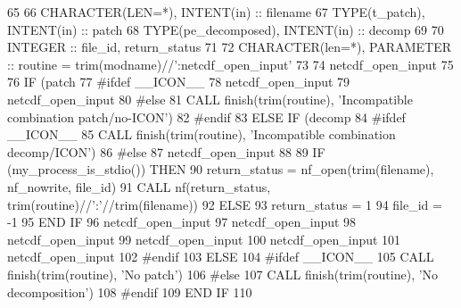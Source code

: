 \begin{DoxyCode}
65 
66     \textcolor{keywordtype}{CHARACTER(LEN=*)},    \textcolor{keywordtype}{INTENT(in)} :: filename
67     \textcolor{keywordtype}{TYPE}(t\_patch),       \textcolor{keywordtype}{INTENT(in)} :: patch
68     \textcolor{keywordtype}{TYPE}(pe\_decomposed), \textcolor{keywordtype}{INTENT(in)} :: decomp
69 
70     \textcolor{keywordtype}{INTEGER} :: file\_id, return\_status
71 
72     \textcolor{keywordtype}{CHARACTER(len=*)}, \textcolor{keywordtype}{PARAMETER} :: routine = trim(modname)//\textcolor{stringliteral}{':netcdf\_open\_input'}
73 
74     netcdf\_open\_input%
75 
76     \textcolor{keywordflow}{IF} (patch%
77 \textcolor{preprocessor}{#ifdef \_\_ICON\_\_}
78 \textcolor{preprocessor}{}      netcdf\_open\_input%
79       netcdf\_open\_input%
80 \textcolor{preprocessor}{#else}
81 \textcolor{preprocessor}{}      \textcolor{keyword}{CALL }finish(trim(routine), \textcolor{stringliteral}{'Incompatible combination patch/no-ICON'})
82 \textcolor{preprocessor}{#endif}
83 \textcolor{preprocessor}{}    \textcolor{keywordflow}{ELSE} \textcolor{keywordflow}{IF} (decomp%
84 \textcolor{preprocessor}{#ifdef \_\_ICON\_\_}
85 \textcolor{preprocessor}{}      \textcolor{keyword}{CALL }finish(trim(routine), \textcolor{stringliteral}{'Incompatible combination decomp/ICON'})
86 \textcolor{preprocessor}{#else}
87 \textcolor{preprocessor}{}      netcdf\_open\_input%
88 
89       \textcolor{keywordflow}{IF} (my\_process\_is\_stdio()) \textcolor{keywordflow}{THEN}
90         return\_status = nf\_open(trim(filename), nf\_nowrite, file\_id)
91         \textcolor{keyword}{CALL }nf(return\_status, trim(routine)//\textcolor{stringliteral}{':'}//trim(filename))
92       \textcolor{keywordflow}{ELSE}
93         return\_status = 1
94         file\_id = -1
95 \textcolor{keywordflow}{      END IF}
96       netcdf\_open\_input%
97       netcdf\_open\_input%
98       netcdf\_open\_input%
99       netcdf\_open\_input%
100       netcdf\_open\_input%
101       netcdf\_open\_input%
102 \textcolor{preprocessor}{#endif}
103 \textcolor{preprocessor}{}    \textcolor{keywordflow}{ELSE}
104 \textcolor{preprocessor}{#ifdef \_\_ICON\_\_}
105 \textcolor{preprocessor}{}      \textcolor{keyword}{CALL }finish(trim(routine), \textcolor{stringliteral}{'No patch'})
106 \textcolor{preprocessor}{#else}
107 \textcolor{preprocessor}{}      \textcolor{keyword}{CALL }finish(trim(routine), \textcolor{stringliteral}{'No decomposition'})
108 \textcolor{preprocessor}{#endif}
109 \textcolor{preprocessor}{}\textcolor{keywordflow}{    END IF}
110 
\end{DoxyCode}


